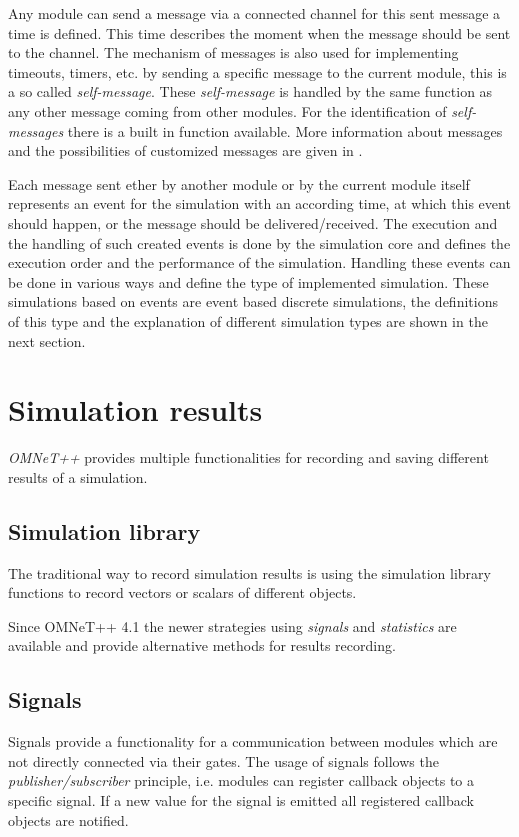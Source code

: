 Any module can send a message via a connected channel for this sent message a time is defined.
This time describes the moment when the message should be sent to the channel.
The mechanism of messages is also used for implementing timeouts, timers, etc. by sending a specific message to the current module, this is a so called \emph{self-message}.
These \emph{self-message} is handled by the same function as any other message coming from other modules.
For the identification of \emph{self-messages} there is a built in function available.
More information about messages and the possibilities of customized messages are given in \cite[chapter 5]{omnet_manual}.

Each message sent ether by another module or by the current module itself represents an event for the simulation with an according time, at which this event should happen, or the message should be delivered/received.
The execution and the handling of such created events is done by the simulation core and defines the execution order and the performance of the simulation.
Handling these events can be done in various ways and define the type of implemented simulation.
These simulations based on events are event based discrete simulations, the definitions of this type and the explanation of different simulation types are shown in the next section.

\section{Simulation results}
\emph{OMNeT++} provides multiple functionalities for recording and saving different results of a simulation.


\subsection{Simulation library}
The traditional way to record simulation results is using the simulation library functions to record vectors or scalars of different objects.

Since OMNeT++ 4.1 the newer strategies using \emph{signals} and \emph{statistics} are available and provide alternative methods for results recording.

\subsection{Signals}
Signals provide a functionality for a communication between modules which are not directly connected via their gates.
The usage of signals follows the \emph{publisher/subscriber} principle, i.e. modules can register callback objects to a specific signal.
If a new value for the signal is emitted all registered callback objects are notified.

